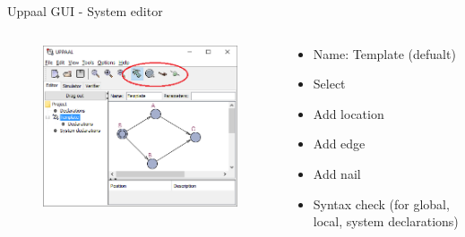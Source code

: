 \documentclass{beamer}
\begin{document}
\begin{frame}{Uppaal GUI - System editor}
	\vspace{-10mm}
	\begin{columns}
		\begin{column}{0.8\textwidth}
			\begin{figure}[H]
				\includegraphics[scale=0.7]{img/uppaal_gui_small_editor_control.png}
			\end{figure}
		\end{column}
		
		\begin{column}{0.3\textwidth}
			\begin{itemize}
				\item Name: Template (defualt)
				\item Select
				\item Add location
				\item Add edge
				\item Add nail
				\item Syntax check (for global, local, system declarations)
			\end{itemize}
		\end{column}
	\end{columns}		
\end{frame}
\end{document}
